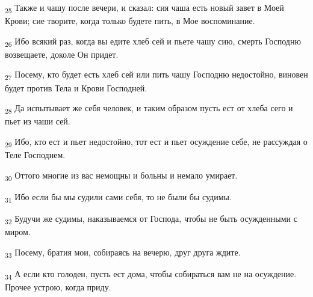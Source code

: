 \begin{tcolorbox}
\textsubscript{25} Также и чашу после вечери, и сказал: сия чаша есть новый завет в Моей Крови; сие творите, когда только будете пить, в Мое воспоминание.
\end{tcolorbox}
\begin{tcolorbox}
\textsubscript{26} Ибо всякий раз, когда вы едите хлеб сей и пьете чашу сию, смерть Господню возвещаете, доколе Он придет.
\end{tcolorbox}
\begin{tcolorbox}
\textsubscript{27} Посему, кто будет есть хлеб сей или пить чашу Господню недостойно, виновен будет против Тела и Крови Господней.
\end{tcolorbox}
\begin{tcolorbox}
\textsubscript{28} Да испытывает же себя человек, и таким образом пусть ест от хлеба сего и пьет из чаши сей.
\end{tcolorbox}
\begin{tcolorbox}
\textsubscript{29} Ибо, кто ест и пьет недостойно, тот ест и пьет осуждение себе, не рассуждая о Теле Господнем.
\end{tcolorbox}
\begin{tcolorbox}
\textsubscript{30} Оттого многие из вас немощны и больны и немало умирает.
\end{tcolorbox}
\begin{tcolorbox}
\textsubscript{31} Ибо если бы мы судили сами себя, то не были бы судимы.
\end{tcolorbox}
\begin{tcolorbox}
\textsubscript{32} Будучи же судимы, наказываемся от Господа, чтобы не быть осужденными с миром.
\end{tcolorbox}
\begin{tcolorbox}
\textsubscript{33} Посему, братия мои, собираясь на вечерю, друг друга ждите.
\end{tcolorbox}
\begin{tcolorbox}
\textsubscript{34} А если кто голоден, пусть ест дома, чтобы собираться вам не на осуждение. Прочее устрою, когда приду.
\end{tcolorbox}
